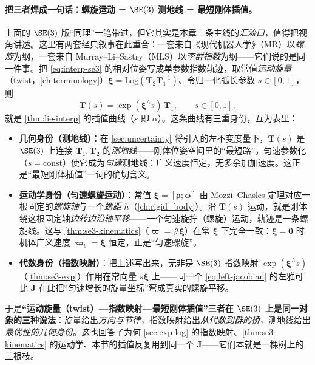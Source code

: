 \paragraph{把三者焊成一句话：螺旋运动 = $\SE(3)$ 测地线 = 最短刚体插值。}
上面的 $\SE(3)$ 版“同理”一笔带过，但它其实是本章三条主线的\emph{汇流口}，值得把视角讲透。这里有两套经典叙事在此重合：一套来自《现代机器人学》（MR）以\emph{螺旋}为纲，一套来自 Murray–Li–Sastry（MLS）以\emph{李群指数}为纲——它们说的是同一件事。把 \cref{eq:interp-se3} 的相对位姿写成单参数指数轨迹，取常值\emph{运动旋量}（twist，\cref{ch:terminology}）$\boldsymbol{\xi}=\mathrm{Log}(\mathbf{T}_2\mathbf{T}_1^{-1})$、令归一化弧长参数 $s\in[0,1]$，则
\[
  \mathbf{T}(s)=\exp(\boldsymbol{\xi}^\wedge s)\,\mathbf{T}_1,\qquad s\in[0,1],
\]
就是 \cref{thm:lie-interp} 的插值曲线（$s$ 即 $\alpha$）。这条曲线有三重身份，互为表里：
\begin{itemize}
  \item \textbf{几何身份（测地线）}：在 \cref{sec:uncertainty} 将引入的左不变度量下，$\mathbf{T}(s)$ 是 $\SE(3)$ 上连接 $\mathbf{T}_1,\mathbf{T}_2$ 的\emph{测地线}——刚体位姿空间里的“最短路”。匀速参数化（$\dot s=\text{const}$）使它成为\emph{匀速}测地线：广义速度恒定，无多余加加速度。这正是“最短刚体插值”一词的确切含义。
  \item \textbf{运动学身份（匀速螺旋运动）}：常值 $\boldsymbol{\xi}=[\boldsymbol{\rho};\boldsymbol{\phi}]$ 由 Mozzi–Chasles 定理对应一根固定的\emph{螺旋轴}与一个\emph{螺距} $h$（\cref{ch:rigid_body}）。沿 $\mathbf{T}(s)$ 运动，就是刚体绕这根固定轴\emph{边转边沿轴平移}——一个匀速旋拧（螺旋）运动，轨迹是一条螺旋线。这与 \cref{thm:se3-kinematics}（$\boldsymbol{\varpi}=\boldsymbol{\mathcal{J}}\dot{\boldsymbol{\xi}}$）在常 $\boldsymbol{\xi}$ 下完全一致：$\dot{\boldsymbol{\xi}}=\mathbf{0}$ 时机体广义速度 $\boldsymbol{\varpi}_b=\boldsymbol{\xi}$ 恒定，正是“匀速螺旋”。
  \item \textbf{代数身份（指数映射）}：把上述写出来，无非是 $\SE(3)$ 指数映射 $\exp(\boldsymbol{\xi}^\wedge s)$（\cref{thm:se3-exp}）作用在常向量 $s\boldsymbol{\xi}$ 上——同一个 \cref{eq:left-jacobian} 的左雅可比 $\mathbf{J}$ 在此把“匀速增长的旋量坐标”弯成真实的螺旋平移。
\end{itemize}
于是\textbf{“运动旋量（twist）—指数映射—最短刚体插值”三者在 $\SE(3)$ 上是同一对象的三种说法}：旋量给出\emph{方向与节律}，指数映射给出\emph{从代数到群的桥}，测地线给出\emph{最优性的几何身份}。这也回答了为何 \cref{sec:exp-log} 的指数映射、\cref{thm:se3-kinematics} 的运动学、本节的插值反复用到同一个 $\mathbf{J}$——它们本就是一棵树上的三根枝。

